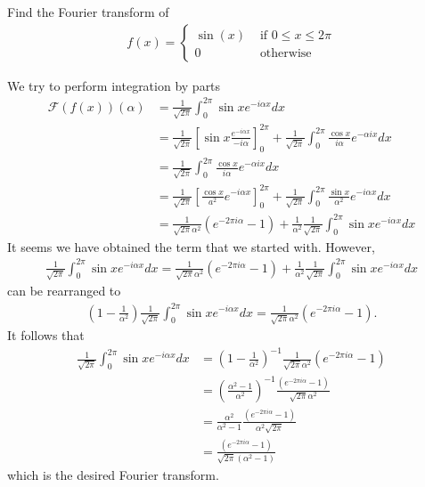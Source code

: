 \documentclass[11pt]{article}
\begin{document}
\begin{exercise}
    Find the Fourier transform of 
    \begin{align*}
        f(x) = \left\{\begin{array}{ll}
                \sin(x) & \text{ if } 0 \leq x \leq 2 \pi 
                \\
                0 & \text{ otherwise }
               \end{array}
               \right.
    \end{align*}
\end{exercise}
\begin{solution} 
We try to perform integration by parts 
\begin{align*} 
    \mathcal{F}(f(x))(\alpha) 
    & =
    \frac{1}{\sqrt{2 \pi}} \int_0^{2 \pi} \sin x e^{-i \alpha x} d x 
    \\ & 
    =
    \frac{1}{\sqrt{2 \pi}}\left[\sin x \frac{e^{-i \alpha x}}{-i \alpha}\right]_0^{2 \pi}
    +
    \frac{1}{\sqrt{2 \pi}} \int_0^{2 \pi} \frac{\cos x}{i \alpha} e^{-\alpha i x} d x 
    \\ & 
    =
    \frac{1}{\sqrt{2 \pi}} \int_0^{2 \pi} \frac{\cos x}{i \alpha} e^{-\alpha i x} d x 
    \\ & 
    =
    \frac{1}{\sqrt{2 \pi}}\left[\frac{\cos x}{a^2} e^{-i \alpha x}\right]_0^{2 \pi}
    +
    \frac{1}{\sqrt{2 \pi}} \int_0^{2 \pi} \frac{\sin x}{\alpha^2} e^{-i \alpha x} d x 
    \\ & 
    =
    \frac{1}{\sqrt{2 \pi} \alpha^2}\left(e^{-2 \pi i \alpha}-1\right)+\frac{1}{\alpha^2} \frac{1}{\sqrt{2 \pi}} \int_0^{2 \pi} \sin x e^{-i \alpha x} d x
\end{align*}
It seems we have obtained the term that we started with. However, 
\begin{align*}
    \frac{1}{\sqrt{2 \pi}} \int_0^{2 \pi} \sin x e^{-i \alpha x} d x 
    =
    \frac{1}{\sqrt{2 \pi} \alpha^2}\left(e^{-2 \pi i \alpha}-1\right)+\frac{1}{\alpha^2} \frac{1}{\sqrt{2 \pi}} \int_0^{2 \pi} \sin x e^{-i \alpha x} d x
\end{align*}
can be rearranged to 
\begin{align*}
    \left( 1 - \frac{1}{\alpha^2} \right)
    \frac{1}{\sqrt{2 \pi}} \int_0^{2 \pi} \sin x e^{-i \alpha x} d x 
    =
    \frac{1}{\sqrt{2 \pi} \alpha^2}\left(e^{-2 \pi i \alpha}-1\right)
    .
\end{align*}
It follows that 
\begin{align*}
    \frac{1}{\sqrt{2 \pi}} \int_0^{2 \pi} \sin x e^{-i \alpha x} d x 
    &
    =
    \left( 1 - \frac{1}{\alpha^2} \right)^{-1}
    \frac{1}{\sqrt{2 \pi} \alpha^2}\left(e^{-2 \pi i \alpha}-1\right)
    \\&
    =
    \left( \frac{\alpha^2-1}{\alpha^2} \right)^{-1}
    \frac{\left(e^{-2 \pi i \alpha}-1\right)}{\sqrt{2 \pi} \alpha^2} 
    \\ & 
    =\frac{\alpha^2}{\alpha^2-1} \frac{\left(e^{-2 \pi i \alpha}-1\right)}{\alpha^2 \sqrt{2 \pi}} 
    \\ & 
    =
    \frac{\left(e^{-2 \pi i \alpha}-1\right)}{\sqrt{2 \pi}\left(\alpha^2-1\right)}
\end{align*}
which is the desired Fourier transform.
\end{solution}
\end{document}
